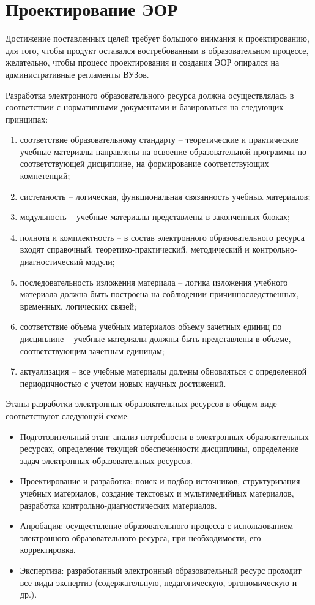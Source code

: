 \section{Проектирование ЭОР}
Достижение поставленных целей требует большого внимания к проектированию, для того, чтобы продукт оставался востребованным в образовательном процессе, желательно, чтобы процесс проектирования и создания ЭОР опирался на административные регламенты ВУЗов\cite{shevardina}.

Разработка электронного образовательного ресурса должна осуществлялась в соответствии с нормативными документами и базироваться на следующих принципах:
\begin{enumerate}
\item соответствие образовательному стандарту – теоретические и практические учебные материалы направлены на освоение образовательной программы по соответствующей дисциплине, на формирование соответствующих компетенций;
\item системность – логическая, функциональная связанность учебных материалов;
\item модульность – учебные материалы представлены в законченных блоках;
\item полнота и комплектность – в состав электронного образовательного ресурса входят справочный, теоретико-практический, методический и контрольно-диагностический модули;
\item последовательность изложения материала – логика изложения учебного материала должна быть построена на соблюдении причинноследственных, временных, логических связей;
\item соответствие объема учебных материалов объему зачетных единиц по дисциплине – учебные материалы должны быть представлены в объеме, соответствующим зачетным единицам;
\item актуализация – все учебные материалы должны обновляться с определенной периодичностью с учетом новых научных достижений.
\end{enumerate}

Этапы разработки электронных образовательных ресурсов в общем виде соответствуют следующей схеме:
\begin{itemize}
\item Подготовительный этап: анализ потребности в электронных образовательных ресурсах, определение текущей обеспеченности дисциплины, определение задач электронных образовательных ресурсов.
\item Проектирование и разработка: поиск и подбор источников, структуризация учебных материалов, создание текстовых и мультимедийных материалов, разработка контрольно-диагностических материалов.
\item Апробация: осуществление образовательного процесса с использованием электронного образовательного ресурса, при необходимости, его корректировка.
\item Экспертиза: разработанный электронный образовательный ресурс проходит все виды экспертиз (содержательную, педагогическую, эргономическую и др.).
\end{itemize}
